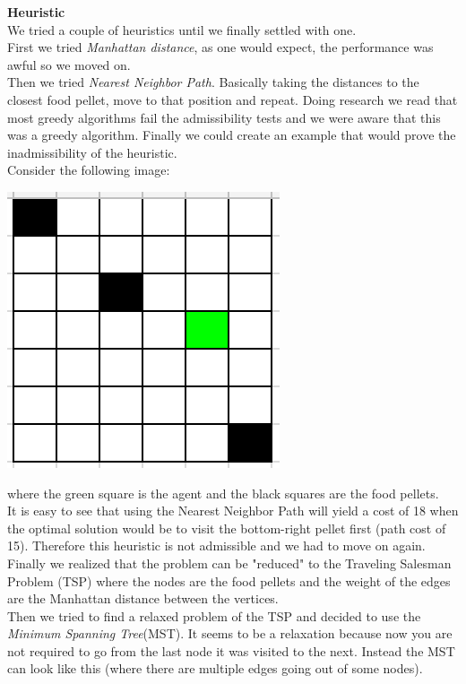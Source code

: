 \documentclass[11pt]{article}
\begin{document}
\textbf{Heuristic}\\
We tried a couple of heuristics until we finally settled with one.\\
First we tried \textit{Manhattan distance}, as one would expect, the performance was awful so we moved on.\\
Then we tried \textit{Nearest Neighbor Path}. Basically taking the distances to the closest food pellet, move to that position and repeat. Doing research we read that most greedy algorithms fail the admissibility tests and we were aware that this was a greedy algorithm. Finally we could create an example that would prove the inadmissibility of the heuristic. \\
Consider the following image:\\
\begin{center}
\includegraphics[scale=1]{nn-counterexample.png}
\end{center}
where the green square is the agent and the black squares are the food pellets. \\ It is easy to see that using the Nearest Neighbor Path will yield a cost of 18 when the optimal solution would be to visit the bottom-right pellet first (path cost of 15). Therefore this heuristic is not admissible and we had to move on again.\\
Finally we realized that the problem can be "reduced" to the Traveling Salesman Problem (TSP) where the nodes are the food pellets and the weight of the edges are the Manhattan distance between the vertices.\\
Then we tried to find a relaxed problem of the TSP and decided to use the \textit{Minimum Spanning Tree}(MST). It seems to be a relaxation because now you are not required to go from the last node it was visited to the next. Instead the MST can look like this (where there are multiple edges going out of some nodes).
\end{document}
